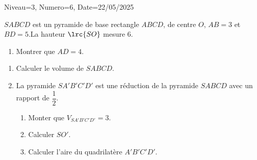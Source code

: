 \documentclass[12pt]{article}
\begin{document}
\begin{Maquette}[DS]{Niveau=3, Numero=6, Date=22/05/2025}
\begin{exercice}[BaremeDetaille=true]
\begin{minipage}{0.65\linewidth}
$SABCD$ est un pyramide de base rectangle $ABCD$, de centre $O$, $AB=3$ et $BD=5$.La hauteur $\lrc{SO}$ mesure $6$.
\begin{enumerate}
\item Montrer que $AD=4$.\par
\anserline[4]
\end{enumerate}
\end{minipage}%
\begin{minipage}{0.35\linewidth}
\end{minipage}%
\begin{enumerate}[start=2]
\item{} Calculer le volume de $SABCD$.\par
\anserline[3]
\item{} La pyramide $SA'B'C'D'$ est une réduction de la pyramide $SABCD$ avec un rapport de $\dfrac{1}{2}$.
\begin{enumerate}
\item{} Monter que $V_{SA'B'C'D'}=3$.\par
\anserline[4]
\item{} Calculer $SO'$.\par
\anserline[5]
\item{} Calculer l'aire du quadrilatère $A'B'C'D'$.\par
\anserline[4]
\end{enumerate}
\end{enumerate}



\end{exercice}




\end{Maquette}
\end{document}
